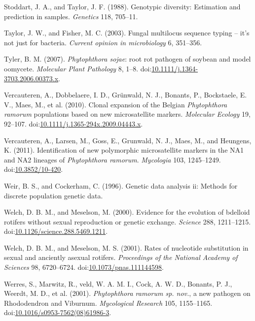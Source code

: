 \documentclass[double,12pt]{beavtex}
\begin{document}
  \hypertarget{ref-stoddart1988genotypic}{}
  Stoddart, J. A., and Taylor, J. F. (1988). Genotypic diversity:
  Estimation and prediction in samples. \emph{Genetics} 118, 705--11.
  
  \hypertarget{ref-taylor2003fungal}{}
  Taylor, J. W., and Fisher, M. C. (2003). Fungal multilocus sequence
  typing -- it's not just for bacteria. \emph{Current opinion in
  microbiology} 6, 351--356.
  
  \hypertarget{ref-tyler2007phytophthora}{}
  Tyler, B. M. (2007). \emph{Phytophthora sojae}: root rot pathogen of
  soybean and model oomycete. \emph{Molecular Plant Pathology} 8, 1--8.
  doi:\href{https://doi.org/10.1111/j.1364-3703.2006.00373.x}{10.1111/j.1364-3703.2006.00373.x}.
  
  \hypertarget{ref-vercauteren2010clonal}{}
  Vercauteren, A., Dobbelaere, I. D., Grünwald, N. J., Bonants, P.,
  Bockstaele, E. V., Maes, M., et al. (2010). Clonal expansion of the
  Belgian \emph{Phytophthora ramorum} populations based on new
  microsatellite markers. \emph{Molecular Ecology} 19, 92--107.
  doi:\href{https://doi.org/10.1111/j.1365-294x.2009.04443.x}{10.1111/j.1365-294x.2009.04443.x}.
  
  \hypertarget{ref-vercauteren2011identification}{}
  Vercauteren, A., Larsen, M., Goss, E., Grunwald, N. J., Maes, M., and
  Heungens, K. (2011). Identification of new polymorphic microsatellite
  markers in the NA1 and NA2 lineages of \emph{Phytophthora ramorum}.
  \emph{Mycologia} 103, 1245--1249.
  doi:\href{https://doi.org/10.3852/10-420}{10.3852/10-420}.
  
  \hypertarget{ref-weir1996genetic}{}
  Weir, B. S., and Cockerham, C. (1996). Genetic data analysis ii: Methods
  for discrete population genetic data.
  
  \hypertarget{ref-welch2000evidence}{}
  Welch, D. B. M., and Meselson, M. (2000). Evidence for the evolution of
  bdelloid rotifers without sexual reproduction or genetic exchange.
  \emph{Science} 288, 1211--1215.
  doi:\href{https://doi.org/10.1126/science.288.5469.1211}{10.1126/science.288.5469.1211}.
  
  \hypertarget{ref-welch2001rates}{}
  Welch, D. B. M., and Meselson, M. S. (2001). Rates of nucleotide
  substitution in sexual and anciently asexual rotifers. \emph{Proceedings
  of the National Academy of Sciences} 98, 6720--6724.
  doi:\href{https://doi.org/10.1073/pnas.111144598}{10.1073/pnas.111144598}.
  
  \hypertarget{ref-werres2001phytophthora}{}
  Werres, S., Marwitz, R., veld, W. A. M. I., Cock, A. W. D., Bonants, P.
  J., Weerdt, M. D., et al. (2001). \emph{Phytophthora ramorum sp. nov.},
  a new pathogen on Rhododendron and Viburnum. \emph{Mycological Research}
  105, 1155--1165.
  doi:\href{https://doi.org/10.1016/s0953-7562(08)61986-3}{10.1016/s0953-7562(08)61986-3}.
  
\end{document}
